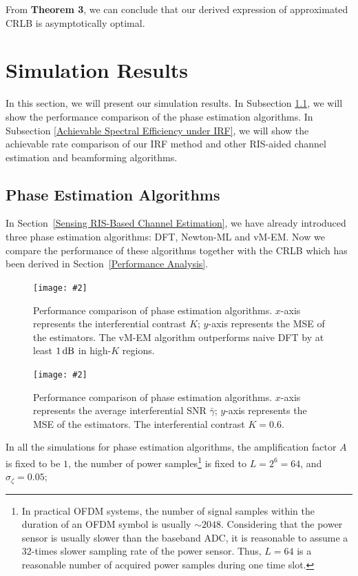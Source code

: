 \documentclass[journal,twocolumn]{IEEEtran}
\theoremstyle{nonumberplain}
\newcommand{\myincludegraphics}[2][width=1\linewidth]{\texttt{[image: \#2]}}
\newcommand{\myincludegraphics}[2][width=0.8\linewidth]{\texttt{[image: \#2]}}
\begin{document}
From {\bf Theorem 3}, we can conclude that our derived expression of approximated CRLB is asymptotically optimal.


\section{Simulation Results}
\label{Simulation Results}
In this section, we will present our simulation results. In Subsection \ref{Phase Estimation Algorithms}, we will show the performance comparison of the phase estimation algorithms. In Subsection \ref{Achievable Spectral Efficiency under IRF}, we will show the achievable rate comparison of our \ac{IRF} method and other RIS-aided channel estimation and beamforming algorithms. 

\subsection{Phase Estimation Algorithms} \label{Phase Estimation Algorithms}
    In Section~\ref{Sensing RIS-Based Channel Estimation}, we have already introduced three phase estimation algorithms: DFT, Newton-ML and vM-EM. Now we compare the performance of these algorithms together with the CRLB which has been derived in Section~\ref{Performance Analysis}. 
    \begin{figure}[!t]
        \centering
        \myincludegraphics{data/pe_K.pdf}
        \caption{Performance comparison of phase estimation algorithms. $x$-axis represents the interferential contrast $K$; $y$-axis represents the MSE of the estimators. The vM-EM algorithm outperforms naive DFT by at least $1\,{\rm dB}$ in high-$K$ regions. }
        \label{fig:phase estimation_K}
    \end{figure}
    \begin{figure}[!t]
        \centering
        \myincludegraphics{data/pe_gamma.pdf}
        \caption{Performance comparison of phase estimation algorithms. $x$-axis represents the average interferential SNR $\bar{\gamma}$; $y$-axis represents the MSE of the estimators. The interferential contrast $K=0.6$. }
        \label{fig:phase estimation_gamma}
    \end{figure}
    In all the simulations for phase estimation algorithms, the amplification factor $A$ is fixed to be $1$, the number of power samples\footnote{In practical OFDM systems, the number of signal samples within the duration of an OFDM symbol is usually $\sim 2048$. Considering that the power sensor is usually slower than the baseband ADC, it is reasonable to assume a 32-times slower sampling rate of the power sensor. Thus, $L=64$ is a reasonable number of acquired power samples during one time slot.} is fixed to $L=2^6=64$, and $\sigma_\zeta=0.05$; 
\end{document}
